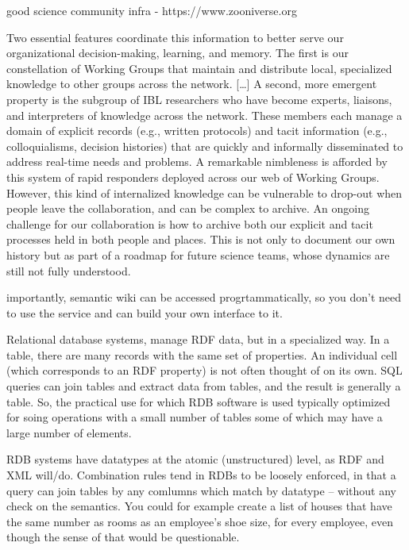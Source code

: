 \documentclass[11pt]{article}
\begin{document}
\begin{multicols}{2}
good science community infra - https://www.zooniverse.org

\begin{leftbar}
Two essential features coordinate this information to better serve our
organizational decision-making, learning, and memory. The first is our
constellation of Working Groups that maintain and distribute local,
specialized knowledge to other groups across the network. {[}\ldots{]} A
second, more emergent property is the subgroup of IBL researchers who
have become experts, liaisons, and interpreters of knowledge across the
network. These members each manage a domain of explicit records (e.g.,
written protocols) and tacit information (e.g., colloquialisms, decision
histories) that are quickly and informally disseminated to address
real-time needs and problems. A remarkable nimbleness is afforded by
this system of rapid responders deployed across our web of Working
Groups. However, this kind of internalized knowledge can be vulnerable
to drop-out when people leave the collaboration, and can be complex to
archive. An ongoing challenge for our collaboration is how to archive
both our explicit and tacit processes held in both people and places.
This is not only to document our own history but as part of a roadmap
for future science teams, whose dynamics are still not fully understood.
\cite{woolKnowledgeNetworksHow2020} 
\end{leftbar}

importantly, semantic wiki can be accessed progrtammatically, so you
don't need to use the service and can build your own interface to it.

\begin{leftbar}
Relational database systems, manage RDF data, but in a specialized way.
In a table, there are many records with the same set of properties. An
individual cell (which corresponds to an RDF property) is not often
thought of on its own. SQL queries can join tables and extract data from
tables, and the result is generally a table. So, the practical use for
which RDB software is used typically optimized for soing operations with
a small number of tables some of which may have a large number of
elements.

RDB systems have datatypes at the atomic (unstructured) level, as RDF
and XML will/do. Combination rules tend in RDBs to be loosely enforced,
in that a query can join tables by any comlumns which match by datatype
-- without any check on the semantics. You could for example create a
list of houses that have the same number as rooms as an employee's shoe
size, for every employee, even though the sense of that would be
questionable.


\end{leftbar}
\end{multicols}
\end{document}
